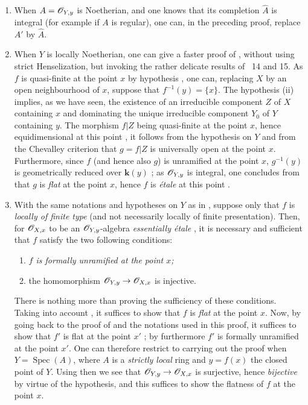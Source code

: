 \begin{remarks}[18.10.2]
\label{IV.18.10.2}
\medskip\noindent
\begin{enumerate}[label=(\roman*)]
  \item When $A=\mathscr{O}_{Y,y}$ is Noetherian, and one knows that its completion $\hat{A}$ is integral (for example if $A$ is regular), one can, in the preceding proof, replace $A'$ by $\hat{A}$.
  \item When $Y$ is locally Noetherian, one can give a faster proof of , without using strict Henselization, but invoking the rather delicate results of \textsection\textsection~14 and 15.
As $f$ is quasi-finite at the point $x$ by hypothesis , one can, replacing $X$ by an open neighbourhood of $x$, suppose that $f^{-1}(y)=\{x\}$.
The hypothesis (ii) implies, as we have seen, the existence of an irreducible component $Z$ of $X$ containing $x$ and dominating the unique irreducible component $Y_0$ of $Y$ containing $y$.
The morphism $f|Z$ being quasi-finite at the point $x$, hence equidimensional at this point , it follows from the hypothesis on $Y$ and from the Chevalley criterion  that $g=f|Z$ is universally open at the point $x$.
Furthermore, since $f$ (and hence also $g$) is unramified at the point $x$, $g^{-1}(y)$ is geometrically reduced over $\boldsymbol{k}(y)$ ; as $\mathscr{O}_{Y,y}$ is integral, one concludes from  that $g$ is \emph{flat} at the point $x$, hence $f$ is \emph{\'etale} at this point .
  \item With the same notations and hypotheses on $Y$ as in , suppose only that $f$ is \emph{locally of finite type} (and not necessarily locally of finite presentation).
Then, for $\mathscr{O}_{X,x}$ to be an $\mathscr{O}_{Y,y}$-algebra \emph{essentially \'etale} , it is necessary and sufficient that $f$ satisfy the two following conditions:
\begin{enumerate}[label=\arabic*\textsuperscript{o}]
  \item \itshape $f$ is formally unramified at the point $x$;
  \item the homomorphism $\mathscr{O}_{Y,y}\to\mathscr{O}_{X,x}$ is injective.
\end{enumerate}

There is nothing more than proving the sufficiency of these conditions.
Taking into account , it suffices to show that $f$ is \emph{flat} at the point $x$.
Now, by going back to the proof of  and the notations used in this proof, it suffices to show that $f'$ is flat at the point $x'$ ; by  furthermore $f'$ is formally unramified at the point $x'$.
One can therefore restrict to carrying out the proof when $Y=\operatorname{Spec}(A)$, where $A$ is a \emph{strictly local} ring and $y=f(x)$ the closed point of $Y$.
Using then  we see that $\mathscr{O}_{Y,y}\to\mathscr{O}_{X,x}$ is surjective, hence \emph{bijective} by virtue of the hypothesis, and this suffices to show the flatness of $f$ at the point $x$.


\end{enumerate}
\end{remarks}
